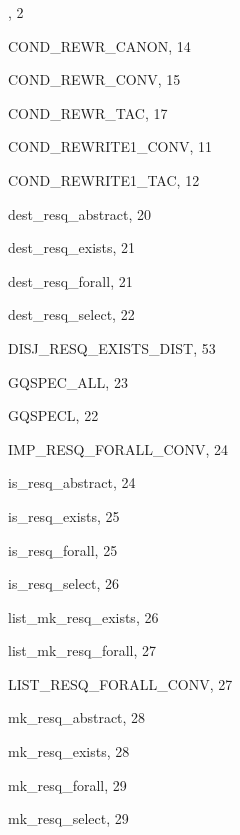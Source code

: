\begin{theindex}

  \item {}, 2

  \indexspace

  \item {\ptt COND\_REWR\_CANON}, 14
  \item {\ptt COND\_REWR\_CONV}, 15
  \item {\ptt COND\_REWR\_TAC}, 17
  \item {\ptt COND\_REWRITE1\_CONV}, 11
  \item {\ptt COND\_REWRITE1\_TAC}, 12

  \indexspace

  \item {\ptt dest\_resq\_abstract}, 20
  \item {\ptt dest\_resq\_exists}, 21
  \item {\ptt dest\_resq\_forall}, 21
  \item {\ptt dest\_resq\_select}, 22
  \item {\ptt DISJ\_RESQ\_EXISTS\_DIST}, 53

  \indexspace

  \item {\ptt GQSPEC\_ALL}, 23
  \item {\ptt GQSPECL}, 22

  \indexspace

  \item {\ptt IMP\_RESQ\_FORALL\_CONV}, 24
  \item {\ptt is\_resq\_abstract}, 24
  \item {\ptt is\_resq\_exists}, 25
  \item {\ptt is\_resq\_forall}, 25
  \item {\ptt is\_resq\_select}, 26

  \indexspace

  \item {\ptt list\_mk\_resq\_exists}, 26
  \item {\ptt list\_mk\_resq\_forall}, 27
  \item {\ptt LIST\_RESQ\_FORALL\_CONV}, 27

  \indexspace

  \item {\ptt mk\_resq\_abstract}, 28
  \item {\ptt mk\_resq\_exists}, 28
  \item {\ptt mk\_resq\_forall}, 29
  \item {\ptt mk\_resq\_select}, 29


\end{theindex}
